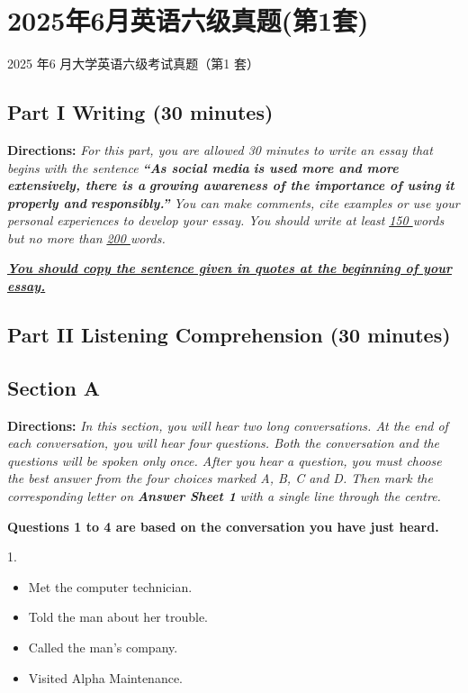 \documentclass[UTF8,11pt]{ctexart}
\begin{document}
\section*{2025年6月英语六级真题(第1套)}
2025 年6 月大学英语六级考试真题（第1 套）


\subsection*{\textbf{Part I Writing} \textbf{(30 minutes)}}


\textbf{Directions:}\textit{ For this part, you are allowed 30 minutes to write an essay that begins with the sentence }\textbf{\textit{“As social media}} \textbf{\textit{is used more and more extensively, there is a}} \textbf{\textit{growing awareness of the importance of using}} \textbf{\textit{it properly and}} \textbf{\textit{responsibly.”}}\textit{ You can make comments, cite examples or use your personal experiences to develop your essay. You} \textit{should write at least }\textit{\uline{150 }}\textit{words but no more than }\textit{\uline{200 }}\textit{words.}


\textbf{\textit{\uline{You should copy the sentence given in quotes at the beginning of your essay.}}}


\subsection*{\textbf{Part II} \textbf{Listening Comprehension} \textbf{(30 minutes)}}


\subsection*{\textbf{Section A}}


\textbf{Directions:} \textit{In this section, you will hear two long conversations. At the end of each conversation, you will hear four} \textit{questions. Both the conversation and the questions will be spoken only once. After you hear a question, you must choose} \textit{the best answer from the four choices marked A, B, C and D. Then mark the corresponding letter on }\textbf{\textit{Answer Sheet 1}} \textit{with a single line through the centre.}


\textbf{Questions 1 to 4 are based on the conversation you have just heard.}


1.


\begin{itemize}[leftmargin=2em,itemsep=.2em,topsep=.4em]\item[A.] Met the computer technician.
\item[B.] Told the man about her trouble.
\item[C.] Called the man’s company.
\item[D.] Visited Alpha Maintenance.
\end{itemize}
\end{document}
